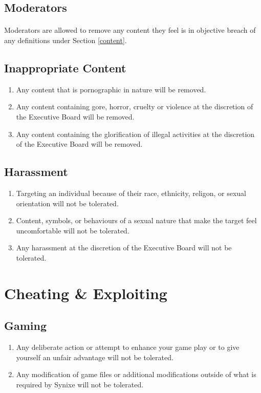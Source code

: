 \documentclass[10pt,a4paper]{article}
\begin{document}
\subsection{Moderators}
\paragraph{}
Moderators are allowed to remove any content they feel is in objective breach of any definitions under Section \ref{content}.
\subsection{Inappropriate Content}
\begin{enumerate}
	\item Any content that is pornographic in nature will be removed.
	\item Any content containing gore, horror, cruelty or violence at the discretion of the Executive Board will be removed.
	\item Any content containing the glorification of illegal activities at the discretion of the Executive Board will be removed.
\end{enumerate}
\subsection{Harassment}
\begin{enumerate}
	\item Targeting an individual because of their race, ethnicity, religon, or sexual orientation will not be tolerated.
	\item Content, symbols, or behaviours of a sexual nature that make the target feel uncomfortable will not be tolerated.
	\item Any harassment at the discretion of the Executive Board will not be tolerated.
	
\end{enumerate}
\section{Cheating \& Exploiting} \label{cheating}
\subsection{Gaming}
\begin{enumerate}
	\item Any deliberate action or attempt to enhance your game play or to give yourself an unfair advantage will not be tolerated.
	\item Any modification of game files or additional modifications outside of what is required by Synixe will not be tolerated.
\end{enumerate}
\end{document}
